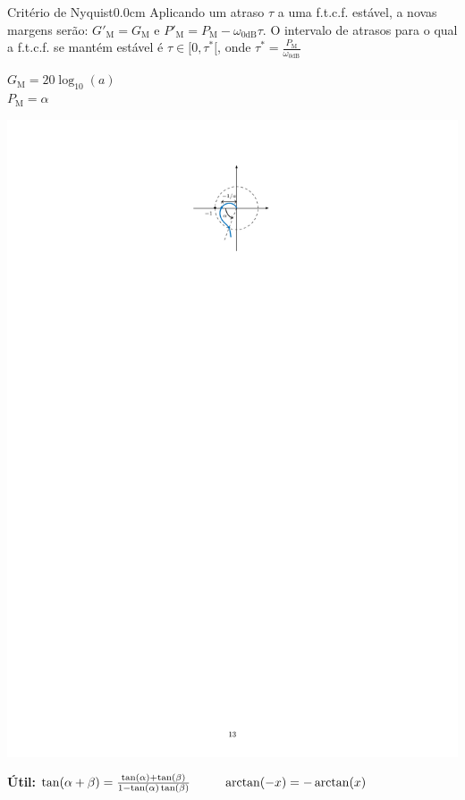 \documentclass[portuguese,10pt,3col]{cheatsheet}
\begin{document}
\begin{multicols}{3}
\begin{cheatsheetbox}{Critério de Nyquist}{0.0cm}
    Aplicando um atraso $\tau$ a uma f.t.c.f. estável, a novas margens serão: $G'_\text{M} = G_\text{M}$ e $P'_\text{M} = P_\text{M} - \omega_{0 \text{dB}}\tau$. O intervalo de atrasos para o qual a f.t.c.f. se mantém estável é $\tau \in [0, \tau^*[$, onde $\tau^* = \frac{P_\text{M}}{\omega_{0 \text{dB}}}$
    
    \begin{minipage}{0.5\textwidth}
        $G_\text{M} = 20\log_{10}(a)$ \\
        $P_\text{M} = \alpha$
    \end{minipage}%
    \begin{minipage}{0.5\textwidth}
        \centering
        \includegraphics[scale = 0.8, trim = 9cm 23.5cm 9cm 2.2cm clip]{figs/fig13.pdf}
    \end{minipage}
    
    \textbf{Útil:} $\tan(\alpha + \beta) = \frac{\tan(\alpha) + \tan(\beta)}{1 - \tan(\alpha)\tan(\beta)} \\ \text{\ \ \ \ \ \ \ \ } \arctan(-x) = -\arctan(x)$
\end{cheatsheetbox}


\end{multicols}
\end{document}
